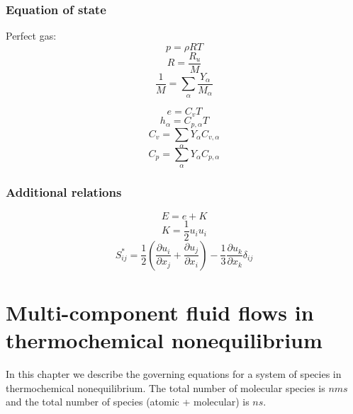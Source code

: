 \documentclass[oneside,a4paper,11pt]{report}
\begin{document}
\subsection{Equation of state}
Perfect gas:
\begin{equation}
    p = \rho R T 
\end{equation}
\begin{equation}
    R = \frac{R_u}{M}
\end{equation}
\begin{equation}
    \frac{1}{M} = \sum_\alpha \frac{Y_\alpha}{M_\alpha}
\end{equation}

\begin{equation}
    e = C_v T
\end{equation}
\begin{equation}
    h_\alpha = C_{p,\alpha} T
\end{equation}
\begin{equation}
    C_v = \sum_\alpha Y_\alpha C_{v,\alpha}
\end{equation}
\begin{equation}
    C_p = \sum_\alpha Y_\alpha C_{p,\alpha}
\end{equation}

\subsection{Additional relations}
\begin{equation}
E = e + K
\end{equation}
\begin{equation}
K = \frac{1}{2} u_i u_i
\end{equation}
\begin{equation}
    S^*_{ij} = \frac{1}{2} \left ( \frac{\partial u_i}{\partial x_j} + \frac{\partial u_j}{\partial x_i} \right ) - \frac{1}{3} \frac{\partial u_k}{\partial x_k} \delta_{ij}
\end{equation}

\chapter{Multi-component fluid flows in thermochemical nonequilibrium}
In this chapter we describe the governing equations for a system of species in thermochemical nonequilibrium. The total number of molecular species is $nms$ and the total number of species (atomic + molecular) is $ns$.
\end{document}

